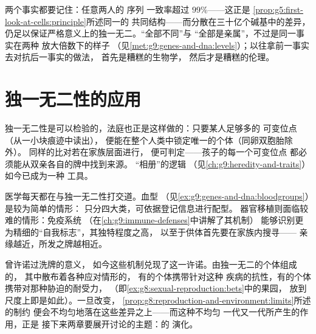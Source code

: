 \begin{remark}\label{rem:g9:unique-individuals:alike}
两个事实都要记住：任意两人的  序列
一致率超过 $99$\%——这正是
\cref{prop:g5:first-look-at-cells:principle}所述同一的
共同结构——而分散在三十亿个碱基中的差异，
仍足以保证严格意义上的独一无二。“全部不同”与
“全部是亲属”，不过是同一事实在两种
放大倍数下的样子
（见\cref{met:g9:genes-and-dna:levels}）；以往拿前一事实去对抗后一事实的做法，
首先是糟糕的生物学，
然后才是糟糕的伦理。
\end{remark}

\section{独一无二性的应用}

\begin{example}[DNA 鉴定]\label{ex:g9:unique-individuals:forensics}
独一无二性是可以检验的，法庭也正是这样做的：只要某人足够多的
可变位点（从一小块痕迹中读出），
便能在整个人类中锁定唯一的个体（同卵双胞胎除外）。
同样的比对若在家族层面进行，
便可判定——孩子的每一个可变位点
都必须能从双亲各自的牌中找到来源。
“相册”的逻辑
（见\cref{ch:g9:heredity-and-traits}）如今已成为一种
工具。
\end{example}

\begin{example}[输血与移植]\label{ex:g9:unique-individuals:medicine}
医学每天都在与独一无二性打交道。血型
（见\cref{ex:g9:genes-and-dna:bloodgroups}）是较为简单的情形：
只分四大类，可依据登记信息进行配型。
器官移植则面临较难的情形：免疫系统
（在\cref{ch:g9:immune-defenses}中讲解了其机制）
能够识别更为精细的“自我标志”，其独特程度之高，
以至于供体首先要在家族内搜寻——
亲缘越近，所发之牌越相近。
\end{example}

\begin{proposition}[多样性是物种的储备]\label{prop:g9:unique-individuals:reserve}
曾许诺过洗牌的意义，
如今这些机制兑现了这一许诺。由独一无二的个体组成的，
其中散布着各种应对情形的，
有的个体携带针对这种
疾病的抗性，有的个体携带对那种胁迫的耐受力，
（即\cref{ex:g8:sexual-reproduction:bets}中的果园，
放到尺度上即是如此）。一旦改变，
\cref{prop:g8:reproduction-and-environment:limits}所述的制约
便会不均匀地落在这些差异之上——而这种不均匀
一代又一代所产生的作用，正是
接下来两章要展开讨论的主题：的
演化。
\end{proposition}
\admitted

